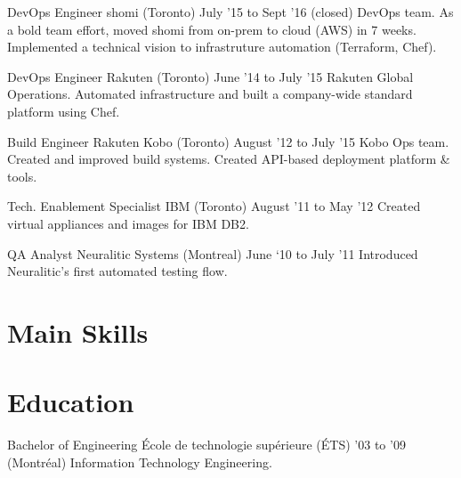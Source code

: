 \documentclass[]{cvpn}
\begin{document}
\begin{multicols}{2}
\begin{eventlist}
\item{DevOps Engineer}
     {shomi (Toronto)}
     {July '15 to Sept '16 (closed)}
{
DevOps team. As a bold team effort, moved shomi from on-prem to cloud (AWS) in 7 weeks.
Implemented a technical vision to infrastruture automation (Terraform, Chef).
}

\item{DevOps Engineer}
     {Rakuten (Toronto)}
     {June '14 to July '15}
{
Rakuten Global Operations.
Automated infrastructure and built a company-wide
standard platform using Chef.
}

\eventlink{}

\item{Build Engineer}
     {Rakuten Kobo (Toronto)}
     {August '12 to July '15}
{
Kobo Ops team.
Created and improved build systems.
Created API-based deployment platform \& tools.
}

\item{Tech. Enablement Specialist}
     {IBM (Toronto)}
     {August '11 to May '12}
{
Created virtual appliances and images for IBM DB2.
}

\item{QA Analyst}
     {Neuralitic Systems (Montreal)}
     {June ‘10 to July ’11}
{
Introduced Neuralitic's first automated testing flow.
}

\end{eventlist}

\section{Main Skills}

\begin{skillslist}


\end{skillslist}

\section{Education}
\begin{eventlist}

\item{Bachelor of Engineering}
     {École de technologie supérieure (ÉTS)}
     {'03 to '09}
{
(Montréal) Information Technology Engineering.
}


\end{eventlist}
\end{multicols}
\end{document}
